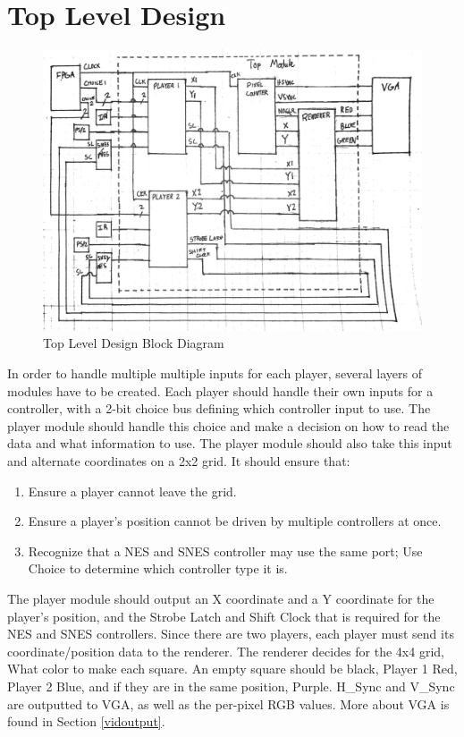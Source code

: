 \documentclass[]{article}
\begin{document}
\section{Top Level Design}
\begin{figure}[H]\centering
    \includegraphics[width=\linewidth]{figures/Top_Block.jpg}
    \caption{Top Level Design Block Diagram} 
    \label{fig:TopLevelDesign}
\end{figure}

In order to handle multiple multiple inputs for each player, several layers of modules have to be created.
Each player should handle their own inputs for a controller, with a 2-bit choice bus defining which controller input to use.
The player module should handle this choice and make a decision on how to read the data and what information to use.
The player module should also take this input and alternate coordinates on a 2x2 grid. It should ensure that:
\begin{enumerate}
    \item Ensure a player cannot leave the grid.
    \item Ensure a player's position cannot be driven by multiple controllers at once.
    \item Recognize that a NES and SNES controller may use the same port; Use Choice to determine which controller type it is.
\end{enumerate}
The player module should output an X coordinate and a Y coordinate for the player's position,
and the Strobe Latch and Shift Clock that is required for the NES and SNES controllers.
Since there are two players, each player must send its coordinate/position data to the renderer.
The renderer decides for the 4x4 grid, What color to make each square. An empty square should
be black, Player 1 Red, Player 2 Blue, and if they are in the same position, Purple. 
H\_Sync and V\_Sync are outputted to VGA, as well as the per-pixel RGB values.
More about VGA is found in Section \ref{vidoutput}.
\end{document}
